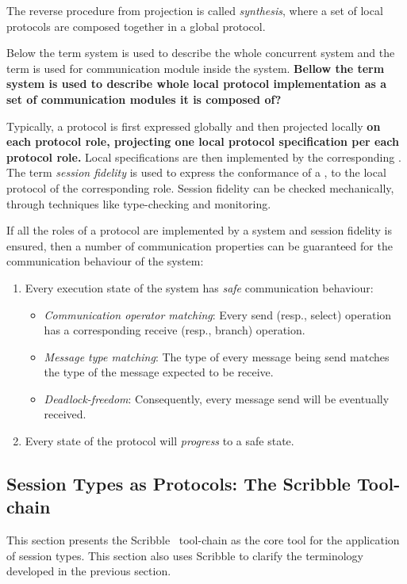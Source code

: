 The reverse procedure from projection is called {\em synthesis},
where a set of local protocols are composed together in a global
protocol.

Below the term system is used to describe the whole concurrent
system and the term  is used for communication module
inside the system. \textbf{Bellow the term system is used to describe whole local protocol implementation as a set of communication modules it is composed of? }


Typically, a protocol is first expressed globally and then
projected locally \textbf{on each protocol role, projecting one local protocol specification per each protocol role.}
Local specifications are then implemented by the corresponding
.
The term {\em session fidelity} is used to express
the conformance of a , to the local protocol of the
corresponding role. Session fidelity can be checked mechanically,
through techniques like type-checking and monitoring.

If all the roles of a protocol are implemented by a
system and session fidelity is ensured,
then a number of communication properties can be guaranteed
for the communication behaviour of the system:
%
\begin{enumerate}[label=$\bullet$]
	\item	Every execution state of the system has {\em safe} communication behaviour:
	\begin{itemize}
		\item	{\em Communication operator matching}: Every send (resp., select) operation has a corresponding receive (resp., branch) operation.
		\item	{\em Message type matching}: The type of every message being send matches the type of the message expected to be receive.
		\item	{\em Deadlock-freedom}: Consequently, every message send will be eventually received.
	\end{itemize}
	
	\item	Every state of the protocol will {\em progress} to a safe state.
\end{enumerate}


\subsection{Session Types as Protocols: The Scribble Tool-chain}

This section presents the Scribble~\cite{scribble} tool-chain
as the core tool for the application of session types.
This section also uses Scribble to clarify the terminology
developed in the previous section.


